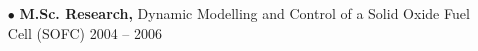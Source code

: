 \documentclass[10pt, letterpaper]{article}
\begin{document}
	\begin{itemize}
		\itemsep-0.1em 
		\item[\tiny$\bullet$] \textbf{M.Sc. Research, }Dynamic Modelling and Control of a Solid Oxide Fuel Cell (SOFC) \hfill 2004 -- 2006

		
	\end{itemize}
\end{document}

